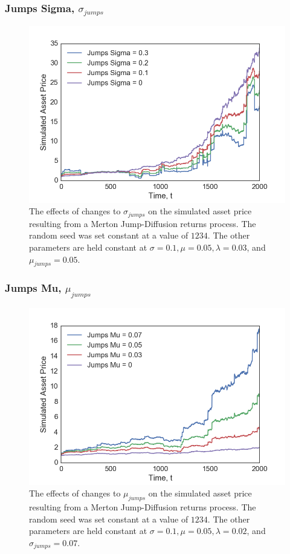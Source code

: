 \documentclass[11pt,oneside,openany,a4paper,english, report, goldenblock
]{usthesis}
\begin{document}
\subsubsection{Jumps Sigma, $\sigma_{jumps}$}

\begin{figure}[h]
	\centering
	\includegraphics[width=0.7\linewidth]{Images/Parameter-Effects/Effects_Jumps_Sigma}
	\caption[The effects of changes to $\sigma_{jumps}$ on the Merton Jump-Diffusion returns process]{The effects of changes to $\sigma_{jumps}$ on the simulated asset price resulting from a Merton Jump-Diffusion returns process. The random seed was set constant at a value of $1234$. The other parameters are held constant at $\sigma=0.1, \mu=0.05, \lambda=0.03$, and $\mu_{jumps}=0.05$.}
	\label{fig:effects_jumps_sigma}
\end{figure}

\newpage
\subsubsection{Jumps Mu, $\mu_{jumps}$}

\begin{figure}[h]
	\centering
	\includegraphics[width=0.7\linewidth]{Images/Parameter-Effects/Effects_Jumps_Mu}
	\caption[The effects of changes to $\mu_{jumps}$ on the Merton Jump-Diffusion returns process]{The effects of changes to $\mu_{jumps}$ on the simulated asset price resulting from a Merton Jump-Diffusion returns process. The random seed was set constant at a value of $1234$. The other parameters are held constant at $\sigma=0.1, \mu=0.05, \lambda=0.02$, and $\sigma_{jumps}=0.07$.}
	\label{fig:effects_jumps_mu}
\end{figure}
\end{document}
